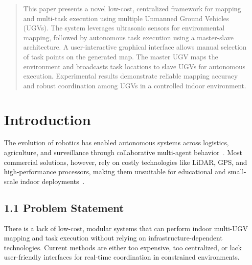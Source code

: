 \documentclass[conference]{IEEEtran}
\begin{document}
\author{
}

\maketitle

\begin{abstract}
  This paper presents a novel low-cost, centralized framework for mapping and multi-task execution using multiple Unmanned Ground Vehicles (UGVs). The system leverages ultrasonic sensors for environmental mapping, followed by autonomous task execution using a master-slave architecture. A user-interactive graphical interface allows manual selection of task points on the generated map. The master UGV maps the environment and broadcasts task locations to slave UGVs for autonomous execution. Experimental results demonstrate reliable mapping accuracy and robust coordination among UGVs in a controlled indoor environment.
\end{abstract}

\section{Introduction}
\label{sec:intro}
The evolution of robotics has enabled autonomous systems across logistics, agriculture, and surveillance through collaborative multi-agent behavior~\cite{brambilla2013swarm}. Most commercial solutions, however, rely on costly technologies like LiDAR, GPS, and high-performance processors, making them unsuitable for educational and small-scale indoor deployments~\cite{kalra2005hoplite}.

\subsection*{1.1 Problem Statement}

There is a lack of low-cost, modular systems that can perform indoor multi-UGV mapping and task execution without relying on infrastructure-dependent technologies. Current methods are either too expensive, too centralized, or lack user-friendly interfaces for real-time coordination in constrained environments.
\end{document}
